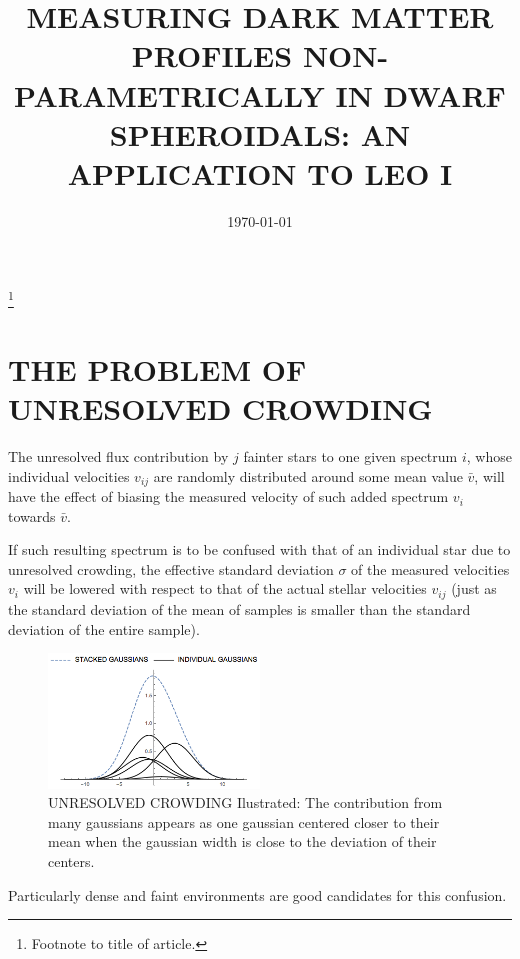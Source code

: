 \documentclass[%
 aip,
 twocolumn,
 jmp,%
 amsmath,amssymb,
 reprint,%
]{aastex61}
\begin{document}

\title[MEASURING DARK MATTER PROFILES NON-PARAMETRICALLY IN DWARF SPHEROIDALS]{MEASURING DARK MATTER PROFILES NON-PARAMETRICALLY IN DWARF SPHEROIDALS:
	AN APPLICATION TO LEO I}%
\thanks{Footnote to title of article.}


\date{\today}%




\section{THE PROBLEM OF UNRESOLVED CROWDING}



The unresolved flux contribution by $j$ fainter stars to one given spectrum $i$, 
whose individual velocities $v_{ij}$ are randomly distributed around some mean value $\bar{v}$, will have the effect of biasing the measured velocity of 
such added spectrum $v_i$ towards $\bar{v}$.

If such resulting spectrum is to be confused with that 
of an individual star due to unresolved crowding, the effective 
standard deviation $\sigma$ of the measured velocities $v_i$ will be lowered
with respect to that of the actual stellar velocities $v_{ij}$
(just as the standard deviation of the mean of samples is smaller 
than the standard deviation of the entire sample).

\begin{figure}
\centering
\includegraphics[width=0.5\textwidth]{CROWDING/UNRESOLVED_CROWDING.png}
\caption{UNRESOLVED CROWDING Ilustrated: The contribution from many gaussians appears as one gaussian centered closer to their mean when the gaussian width is close to the deviation of their centers.}       
\end{figure}

Particularly dense and faint environments are good candidates for this confusion.
\end{document}
